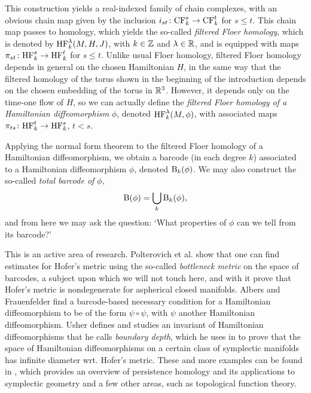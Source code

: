 This construction yields a real-indexed family of chain complexes, with an obvious chain map given by the inclusion $i_{st} \colon \mathrm{CF}_k^s \to \mathrm{CF}_k^t$ for $s \leq t$. This chain map passes to homology, which yields the so-called \emph{filtered Floer homology}, which is denoted by $\mathrm{HF}_k^\lambda(M,H,J)$, with $k \in \mathbb{Z}$ and $\lambda \in \mathbb{R}$, and is equipped with maps $\pi_{st} \colon \mathrm{HF}_k^s \to \mathrm{HF}_k^t$ for $s \leq t$. Unlike usual Floer homology, filtered Floer homology depends in general on the chosen Hamiltonian $H$, in the same way that the filtered homology of the torus shown in the beginning of the introduction depends on the chosen embedding of the torus in $\mathbb{R}^3$. However, it depends only on the time-one flow of $H$, so we can actually define the \emph{filtered Floer homology of a Hamiltonian diffeomorphism} $\phi$, denoted $\mathrm{HF}_k^\lambda(M,\phi)$, with associated maps $\pi_{ts} \colon \mathrm{HF}_k^t \to \mathrm{HF}_k^s$, $t<s$.

Applying the normal form theorem to the filtered Floer homology of a Hamiltonian diffeomorphism, we obtain a barcode (in each degree $k$) associated to a Hamiltonian diffeomorphism $\phi$, denoted $\mathrm{B}_k(\phi)$. We may also construct the so-called \emph{total barcode of $\phi$},
\begin{equation}
\mathrm{B}(\phi) = \bigcup_k \mathrm{B}_k(\phi),
\end{equation}
and from here we may ask the question: `What properties of $\phi$ can we tell from its barcode?' 

This is an active area of research. Polterovich et al. \cite{polterovich} show that one can find estimates for Hofer's metric using the so-called \emph{bottleneck metric} on the space of barcodes, a subject upon which we will not touch here, and with it prove that Hofer's metric is nondegenerate for aspherical closed manifolds. Albers and Frauenfelder \cite{albers2014square} find a barcode-based necessary condition for a Hamiltonian diffeomorphism to be of the form $\psi \circ \psi$, with $\psi$ another Hamiltonian diffeomorphism. Usher \cite{usher1} defines and studies an invariant of Hamiltonian diffeomorphisms that he calls \emph{boundary depth}, which he uses in \cite{usher2} to prove that the space of Hamiltonian diffeomorphisms on a certain class of symplectic manifolds has infinite diameter wrt. Hofer's metric. These and more examples can be found in \cite{polterovich}, which provides an overview of persistence homology and its applications to symplectic geometry and a few other areas, such as topological function theory.

